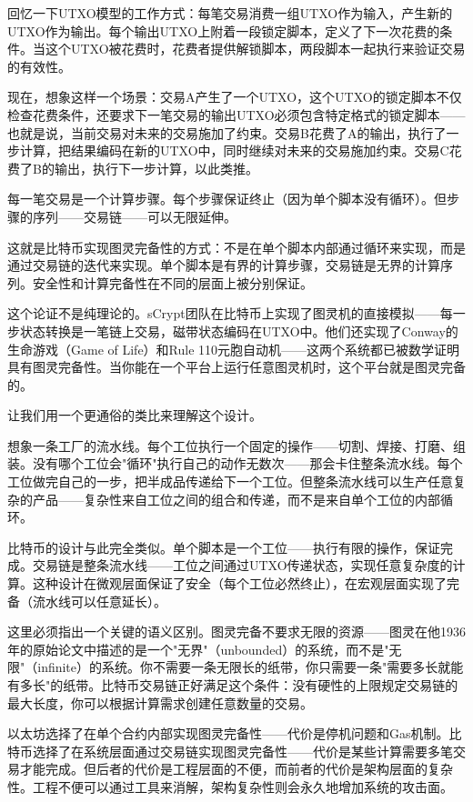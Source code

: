 \documentclass[a4paper,12pt,openany]{ctexbook}
\begin{document}
回忆一下UTXO模型的工作方式：每笔交易消费一组UTXO作为输入，产生新的UTXO作为输出。每个输出UTXO上附着一段锁定脚本，定义了下一次花费的条件。当这个UTXO被花费时，花费者提供解锁脚本，两段脚本一起执行来验证交易的有效性。

现在，想象这样一个场景：交易A产生了一个UTXO，这个UTXO的锁定脚本不仅检查花费条件，还要求下一笔交易的输出UTXO必须包含特定格式的锁定脚本——也就是说，当前交易对未来的交易施加了约束。交易B花费了A的输出，执行了一步计算，把结果编码在新的UTXO中，同时继续对未来的交易施加约束。交易C花费了B的输出，执行下一步计算，以此类推。

每一笔交易是一个计算步骤。每个步骤保证终止（因为单个脚本没有循环）。但步骤的序列——交易链——可以无限延伸。

这就是比特币实现图灵完备性的方式：不是在单个脚本内部通过循环来实现，而是通过交易链的迭代来实现。单个脚本是有界的计算步骤，交易链是无界的计算序列。安全性和计算完备性在不同的层面上被分别保证。

这个论证不是纯理论的。sCrypt团队在比特币上实现了图灵机的直接模拟——每一步状态转换是一笔链上交易，磁带状态编码在UTXO中。他们还实现了Conway的生命游戏（Game of Life）和Rule 110元胞自动机——这两个系统都已被数学证明具有图灵完备性。当你能在一个平台上运行任意图灵机时，这个平台就是图灵完备的。

让我们用一个更通俗的类比来理解这个设计。

想象一条工厂的流水线。每个工位执行一个固定的操作——切割、焊接、打磨、组装。没有哪个工位会"循环"执行自己的动作无数次——那会卡住整条流水线。每个工位做完自己的一步，把半成品传递给下一个工位。但整条流水线可以生产任意复杂的产品——复杂性来自工位之间的组合和传递，而不是来自单个工位的内部循环。

比特币的设计与此完全类似。单个脚本是一个工位——执行有限的操作，保证完成。交易链是整条流水线——工位之间通过UTXO传递状态，实现任意复杂度的计算。这种设计在微观层面保证了安全（每个工位必然终止），在宏观层面实现了完备（流水线可以任意延长）。

这里必须指出一个关键的语义区别。图灵完备不要求无限的资源——图灵在他1936年的原始论文中描述的是一个"无界"（unbounded）的系统，而不是"无限"（infinite）的系统。你不需要一条无限长的纸带，你只需要一条"需要多长就能有多长"的纸带。比特币交易链正好满足这个条件：没有硬性的上限规定交易链的最大长度，你可以根据计算需求创建任意数量的交易。

以太坊选择了在单个合约内部实现图灵完备性——代价是停机问题和Gas机制。比特币选择了在系统层面通过交易链实现图灵完备性——代价是某些计算需要多笔交易才能完成。但后者的代价是工程层面的不便，而前者的代价是架构层面的复杂性。工程不便可以通过工具来消解，架构复杂性则会永久地增加系统的攻击面。
\end{document}
